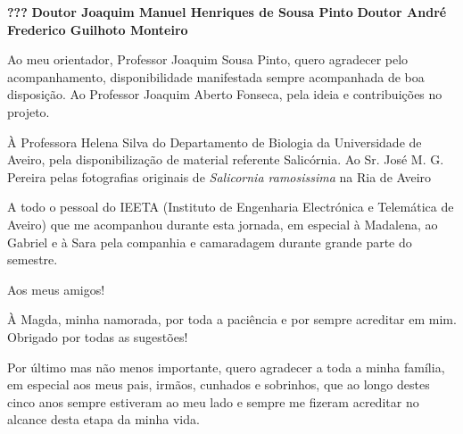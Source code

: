 \documentclass[11pt,twoside,a4paper]{report}
\begin{document}
\TitlePage
  \vspace*{55mm}
       {}
       {\textbf{???}}
  \vspace*{5mm}
       {\textbf{Doutor Joaquim Manuel Henriques de Sousa Pinto}}
  \vspace*{5mm}
  \TEXT{}
       {\textbf{Doutor André Frederico Guilhoto Monteiro
       		}}
\EndTitlePage
\titlepage\ \endtitlepage %

\TitlePage
  \vspace*{55mm}
{Ao meu orientador, Professor Joaquim Sousa Pinto, quero agradecer pelo acompanhamento, disponibilidade manifestada sempre acompanhada de boa disposição. Ao Professor Joaquim Aberto Fonseca, pela ideia e contribuições no projeto.} 

\TEXT{}
{ À Professora Helena Silva do Departamento de Biologia da Universidade de Aveiro, pela disponibilização de material referente Salicórnia. Ao Sr. José M. G. Pereira pelas fotografias originais de \textit{Salicornia ramosissima} na Ria de Aveiro}


\TEXT{}
{A todo o pessoal do IEETA (Instituto de Engenharia Electrónica e Telemática de Aveiro) que me acompanhou durante esta jornada, em especial à Madalena, ao Gabriel e à Sara pela companhia e camaradagem durante grande parte do semestre.}

\TEXT{}
{Aos meus amigos!}   

\TEXT{}
{À Magda, minha namorada, por toda a paciência e por sempre acreditar em mim. Obrigado por todas as sugestões!}




 

	
\TEXT{}
{Por último mas não menos importante, quero agradecer a toda a minha família, em especial aos meus pais, irmãos, cunhados e sobrinhos, que ao longo destes cinco anos sempre estiveram ao meu lado e sempre me fizeram acreditar no alcance desta etapa da minha vida. }
     
\end{document}
